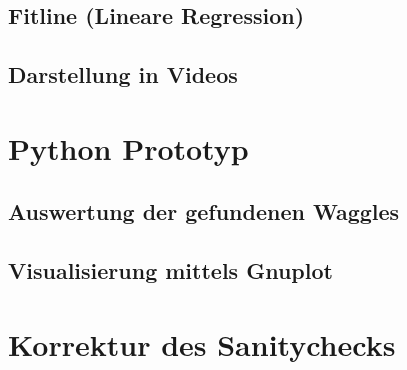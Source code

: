 \documentclass[11pt,a4paper]{article}
\begin{document}
\subsection{Fitline (Lineare Regression)}%
\subsection{Darstellung in Videos}%


\section{Python Prototyp}%

\subsection{Auswertung der gefundenen Waggles}%
\subsection{Visualisierung mittels Gnuplot}%

\section{Korrektur des Sanitychecks}
\end{document}
